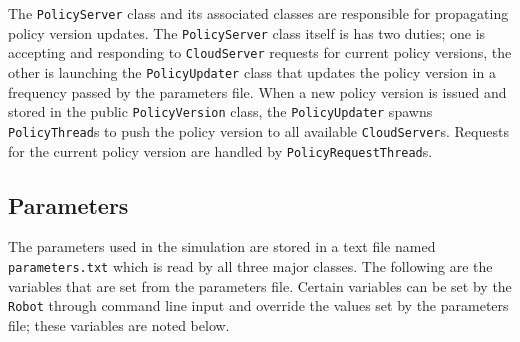 \documentclass[11pt]{article}
\begin{document}
The \texttt{PolicyServer} class and its associated classes are responsible for propagating policy version updates. The \texttt{PolicyServer} class itself is has two duties; one is accepting and responding to \texttt{CloudServer} requests for current policy versions, the other is launching the \texttt{PolicyUpdater} class that updates the policy version in a frequency passed by the parameters file. When a new policy version is issued and stored in the public \texttt{PolicyVersion} class, the \texttt{PolicyUpdater} spawns \texttt{PolicyThread}s to push the policy version to all available \texttt{CloudServer}s. Requests for the current policy version are handled by \texttt{PolicyRequestThread}s.
\subsection{Parameters}
The parameters used in the simulation are stored in a text file named \texttt{parameters.txt} which is read by all three major classes. The following are the variables that are set from the parameters file. Certain variables can be set by the \texttt{Robot} through command line input and override the values set by the parameters file; these variables are noted below.
\end{document}
